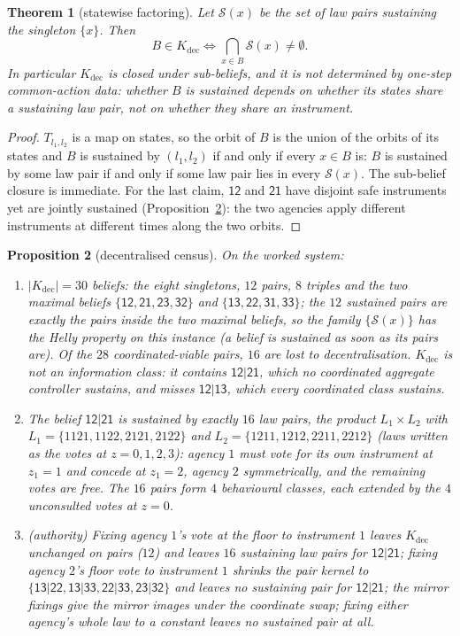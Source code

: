 \documentclass[11pt,a4paper]{article}
\theoremstyle{plain}
\newtheorem{theorem}{Theorem}[section]
\newtheorem{proposition}[theorem]{Proposition}
\theoremstyle{definition}
\theoremstyle{remark}
\newcommand{\calS}{\mathcal{S}}
\newcommand{\st}[1]{\mathsf{#1}}
\newcommand{\Kdec}{K_{\mathrm{dec}}}
\begin{document}
\begin{theorem}[statewise factoring]\label{thm:factor}
Let $\calS(x)$ be the set of law pairs sustaining the singleton $\{x\}$. Then
\[
B\in\Kdec\iff\bigcap_{x\in B}\calS(x)\neq\emptyset .
\]
In particular $\Kdec$ is closed under sub-beliefs, and it is \emph{not} determined by one-step common-action data: whether $B$ is sustained depends on whether its states share a sustaining law pair, not on whether they share an instrument.
\end{theorem}

\begin{proof}
$T_{l_1,l_2}$ is a map on states, so the orbit of $B$ is the union of the orbits of its states and $B$ is sustained by $(l_1,l_2)$ if and only if every $x\in B$ is: $B$ is sustained by some law pair if and only if some law pair lies in every $\calS(x)$. The sub-belief closure is immediate. For the last claim, $\st{12}$ and $\st{21}$ have disjoint safe instruments yet are jointly sustained (Proposition~\ref{prop:deccensus}): the two agencies apply different instruments at different times along the two orbits.
\end{proof}

\begin{proposition}[decentralised census]\label{prop:deccensus}
On the worked system:
\begin{enumerate}[label=(\alph*),leftmargin=2em,itemsep=1pt]
\item $|\Kdec|=30$ beliefs: the eight singletons, $12$ pairs, $8$ triples and the two maximal beliefs $\{\st{12},\st{21},\st{23},\st{32}\}$ and $\{\st{13},\st{22},\st{31},\st{33}\}$; the $12$ sustained pairs are exactly the pairs inside the two maximal beliefs, so the family $\{\calS(x)\}$ has the Helly property on this instance (a belief is sustained as soon as its pairs are). Of the $28$ coordinated-viable pairs, $16$ are lost to decentralisation. $\Kdec$ is not an information class: it contains $\st{12|21}$, which no coordinated aggregate controller sustains, and misses $\st{12|13}$, which every coordinated class sustains.
\item The belief $\st{12|21}$ is sustained by exactly $16$ law pairs, the product $L_1\times L_2$ with $L_1=\{1121,1122,2121,2122\}$ and $L_2=\{1211,1212,2211,2212\}$ (laws written as the votes at $z=0,1,2,3$): agency $1$ must vote for its own instrument at $z_1=1$ and concede at $z_1=2$, agency $2$ symmetrically, and the remaining votes are free. The $16$ pairs form $4$ behavioural classes, each extended by the $4$ unconsulted votes at $z=0$.
\item (\emph{authority}) Fixing agency $1$'s vote at the floor to instrument $1$ leaves $\Kdec$ unchanged on pairs ($12$) and leaves $16$ sustaining law pairs for $\st{12|21}$; fixing agency $2$'s floor vote to instrument $1$ shrinks the pair kernel to $\{\st{13|22},\st{13|33},\st{22|33},\st{23|32}\}$ and leaves no sustaining pair for $\st{12|21}$; the mirror fixings give the mirror images under the coordinate swap; fixing either agency's whole law to a constant leaves no sustained pair at all.
\end{enumerate}
\end{proposition}
\end{document}
